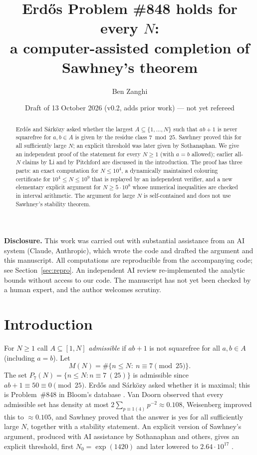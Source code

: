 \documentclass[11pt]{amsart}
\title[Erd\H{o}s Problem \#848 for all $N$]{Erd\H{o}s Problem \#848 holds for every $N$:\\ a computer-assisted completion of Sawhney's theorem}
\author{Ben Zanghi}
\date{Draft of 13 October 2026 (v0.2, adds prior work) --- not yet refereed}
\theoremstyle{definition}
\theoremstyle{remark}
\begin{document}
\begin{abstract}
Erd\H{o}s and S\'ark\"ozy asked whether the largest $A\subseteq\{1,\dots,N\}$ such that $ab+1$ is never
squarefree for $a,b\in A$ is given by the residue class $7 \bmod 25$. Sawhney proved this for all sufficiently
large $N$; an explicit threshold was later given by Sothanaphan. We give an independent proof of the
statement for every $N\ge 1$ (with $a=b$ allowed); earlier all-$N$ claims by Li and by Pitchford are
discussed in the introduction. The proof has three parts: an exact computation for $N\le 10^4$, a
dynamically maintained colouring certificate for $10^4\le N\le 10^9$ that is replayed by an independent
verifier, and a new elementary explicit argument for $N\ge 5\cdot 10^8$ whose numerical inequalities are
checked in interval arithmetic. The argument for large $N$ is self-contained and does not use Sawhney's
stability theorem.
\end{abstract}

\maketitle

\noindent\textbf{Disclosure.} This work was carried out with substantial assistance from an AI system
(Claude, Anthropic), which wrote the code and drafted the argument and this manuscript. All computations
are reproducible from the accompanying code; see Section~\ref{sec:repro}. An independent AI review
re-implemented the analytic bounds without access to our code. The manuscript has not yet been checked by a
human expert, and the author welcomes scrutiny.

\section{Introduction}

For $N\ge1$ call $A\subseteq[1,N]$ \emph{admissible} if $ab+1$ is not squarefree for all $a,b\in A$
(including $a=b$). Let
\[
  M(N)=\#\{n\le N:\ n\equiv 7 \pmod{25}\}.
\]
The set $P_7(N)=\{n\le N: n\equiv 7\ (25)\}$ is admissible since $ab+1\equiv 50\equiv 0\pmod{25}$.
Erd\H{o}s and S\'ark\"ozy \cite[p.~239]{Er92b} asked whether it is maximal; this is Problem~\#848 in Bloom's
database \cite{EP848}. Van Doorn observed that every admissible set has density at most
$2\sum_{p\equiv1(4)}p^{-2}\approx 0.108$, Weisenberg improved this to $\approx0.105$, and Sawhney
\cite{Sa25} proved that the answer is yes for all sufficiently large $N$, together with a stability
statement. An explicit version of Sawhney's argument, produced with AI assistance by Sothanaphan and others,
gives an explicit threshold, first $N_0=\exp(1420)$ and later lowered to $2.64\cdot10^{17}$ \cite{So26}.
\end{document}
